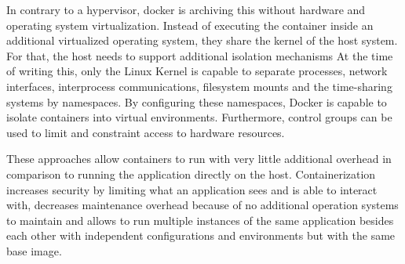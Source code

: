In contrary to a hypervisor, docker is archiving this without hardware and operating system virtualization.
Instead of executing the container inside an additional virtualized operating system, they share the kernel of the host system.
For that, the host needs to support additional isolation mechanisms
At the time of writing this, only the Linux Kernel is capable to separate processes, network interfaces, interprocess communications, filesystem mounts and the time-sharing systems by namespaces.
By configuring these namespaces, Docker is capable to isolate containers into virtual environments.
Furthermore, control groups can be used to limit and constraint access to hardware resources.
\cite{docker:overview}

These approaches allow containers to run with very little additional overhead in comparison to running the application directly on the host.
Containerization increases security by limiting what an application sees and is able to interact with, decreases maintenance overhead because of no additional operation systems to maintain and allows to run multiple instances of the same application besides each other with independent configurations and environments but with the same base image.

